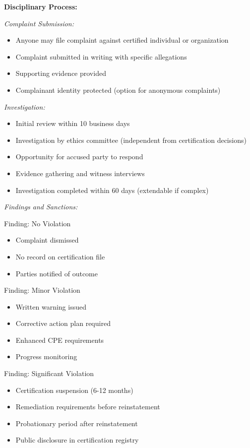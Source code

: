 \documentclass[11pt,a4paper]{article}
\begin{document}
\textbf{Disciplinary Process:}

\textit{Complaint Submission:}
\begin{itemize}
\item Anyone may file complaint against certified individual or organization
\item Complaint submitted in writing with specific allegations
\item Supporting evidence provided
\item Complainant identity protected (option for anonymous complaints)
\end{itemize}

\textit{Investigation:}
\begin{itemize}
\item Initial review within 10 business days
\item Investigation by ethics committee (independent from certification decisions)
\item Opportunity for accused party to respond
\item Evidence gathering and witness interviews
\item Investigation completed within 60 days (extendable if complex)
\end{itemize}

\textit{Findings and Sanctions:}

Finding: No Violation
\begin{itemize}
\item Complaint dismissed
\item No record on certification file
\item Parties notified of outcome
\end{itemize}

Finding: Minor Violation
\begin{itemize}
\item Written warning issued
\item Corrective action plan required
\item Enhanced CPE requirements
\item Progress monitoring
\end{itemize}

Finding: Significant Violation
\begin{itemize}
\item Certification suspension (6-12 months)
\item Remediation requirements before reinstatement
\item Probationary period after reinstatement
\item Public disclosure in certification registry
\end{itemize}
\end{document}
